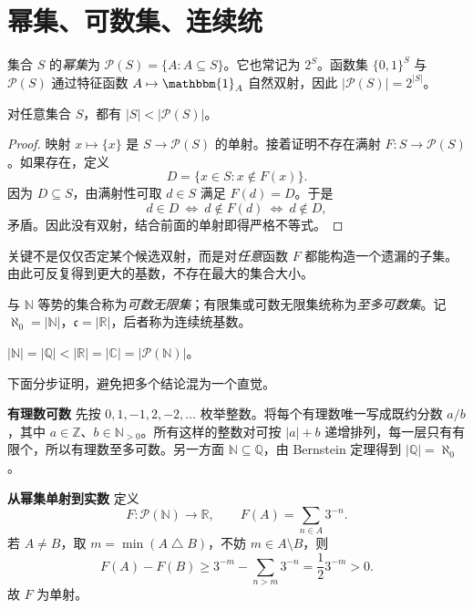 \documentclass[lang=cn,a4paper,fontset=none,zihao=false,10pt,openany,twoside]{beautybook}
\numberwithin{algorithm}{chapter}
\newcommand{\N}{\mathbb N}
\newcommand{\Q}{\mathbb Q}
\newcommand{\R}{\mathbb R}
\newcommand{\C}{\mathbb C}
\newcommand{\Pow}{\mathcal P}
\begin{document}
\section{幂集、可数集、连续统}\label{sec:power-countable}
\begin{definition}
集合 $S$ 的\emph{幂集}为 $\Pow(S)=\{A:A\subseteq S\}$。它也常记为 $2^S$。函数集 $\{0,1\}^S$ 与 $\Pow(S)$ 通过特征函数 $A\mapsto\mathbbm{1}_A$ 自然双射，因此 $|\Pow(S)|=2^{|S|}$。
\end{definition}
\begin{theorem}[Cantor]
对任意集合 $S$，都有 $|S|<|\Pow(S)|$。
\end{theorem}
\begin{proof}
映射 $x\mapsto\{x\}$ 是 $S\to\Pow(S)$ 的单射。接着证明不存在满射 $F:S\to\Pow(S)$。如果存在，定义
\[
 D=\{x\in S:x\notin F(x)\}.
\]
因为 $D\subseteq S$，由满射性可取 $d\in S$ 满足 $F(d)=D$。于是
\[
 d\in D\ \Longleftrightarrow\ d\notin F(d)\ \Longleftrightarrow\ d\notin D,
\]
矛盾。因此没有双射，结合前面的单射即得严格不等式。
\end{proof}
关键不是仅仅否定某个候选双射，而是对\emph{任意}函数 $F$ 都能构造一个遗漏的子集。由此可反复得到更大的基数，不存在最大的集合大小。

\begin{definition}
与 $\N$ 等势的集合称为\emph{可数无限集}；有限集或可数无限集统称为\emph{至多可数集}。记 $\aleph_0=|\N|$，$\mathfrak c=|\R|$，后者称为连续统基数。
\end{definition}
\begin{proposition}
$|\N|=|\Q|<|\R|=|\C|=|\Pow(\N)|$。
\end{proposition}
下面分步证明，避免把多个结论混为一个直觉。

\par\smallskip\noindent\textbf{有理数可数}\quad 
先按 $0,1,-1,2,-2,\ldots$ 枚举整数。将每个有理数唯一写成既约分数 $a/b$，其中 $a\in\mathbb Z$、$b\in\N_{>0}$。所有这样的整数对可按 $|a|+b$ 递增排列，每一层只有有限个，所以有理数至多可数。另一方面 $\N\subseteq\Q$，由 Bernstein 定理得到 $|\Q|=\aleph_0$。

\par\smallskip\noindent\textbf{从幂集单射到实数}\quad 
定义
\[
 F:\Pow(\N)\longrightarrow\R,\qquad F(A)=\sum_{n\in A}3^{-n}.
\]
若 $A\neq B$，取 $m=\min(A\mathbin\triangle B)$，不妨 $m\in A\setminus B$，则
\[
 F(A)-F(B)\geq 3^{-m}-\sum_{n>m}3^{-n}=\frac12 3^{-m}>0.
\]
故 $F$ 为单射。
\end{document}
